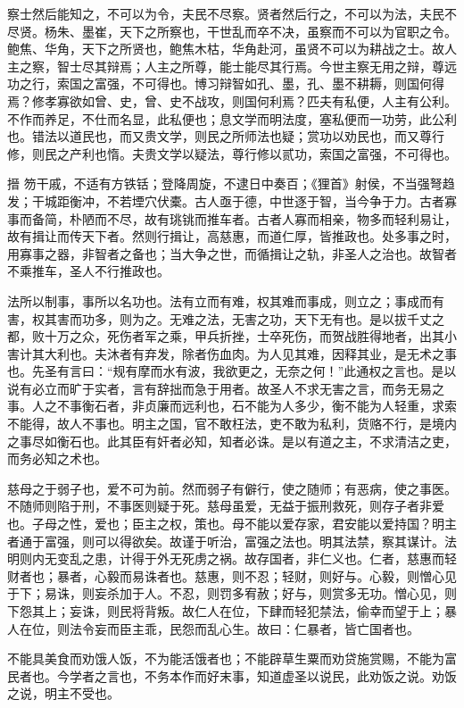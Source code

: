 \documentclass[]{article}
\begin{document}
察士然后能知之，不可以为令，夫民不尽察。贤者然后行之，不可以为法，夫民不尽贤。杨朱、墨崔，天下之所察也，干世乱而卒不决，虽察而不可以为官职之令。鲍焦、华角，天下之所贤也，鲍焦木枯，华角赴河，虽贤不可以为耕战之士。故人主之察，智士尽其辩焉；人主之所尊，能士能尽其行焉。今世主察无用之辩，尊远功之行，索国之富强，不可得也。博习辩智如孔、墨，孔、墨不耕耨，则国何得焉？修孝寡欲如曾、史，曾、史不战攻，则国何利焉？匹夫有私便，人主有公利。不作而养足，不仕而名显，此私便也；息文学而明法度，塞私便而一功劳，此公利也。错法以道民也，而又贵文学，则民之所师法也疑；赏功以劝民也，而又尊行修，则民之产利也惰。夫贵文学以疑法，尊行修以贰功，索国之富强，不可得也。

搢
笏干戚，不适有方铁铦；登降周旋，不逮日中奏百；《狸首》射侯，不当强弩趋发；干城距衡冲，不若堙穴伏橐。古人亟于德，中世逐于智，当今争于力。古者寡事而备简，朴陋而不尽，故有珧铫而推车者。古者人寡而相亲，物多而轻利易让，故有揖让而传天下者。然则行揖让，高慈惠，而道仁厚，皆推政也。处多事之时，用寡事之器，非智者之备也；当大争之世，而循揖让之轨，非圣人之治也。故智者不乘推车，圣人不行推政也。

法所以制事，事所以名功也。法有立而有难，权其难而事成，则立之；事成而有害，权其害而功多，则为之。无难之法，无害之功，天下无有也。是以拔千丈之都，败十万之众，死伤者军之乘，甲兵折挫，士卒死伤，而贺战胜得地者，出其小害计其大利也。夫沐者有弃发，除者伤血肉。为人见其难，因释其业，是无术之事也。先圣有言曰：``规有摩而水有波，我欲更之，无奈之何！''此通权之言也。是以说有必立而旷于实者，言有辞拙而急于用者。故圣人不求无害之言，而务无易之事。人之不事衡石者，非贞廉而远利也，石不能为人多少，衡不能为人轻重，求索不能得，故人不事也。明主之国，官不敢枉法，吏不敢为私利，货赂不行，是境内之事尽如衡石也。此其臣有奸者必知，知者必诛。是以有道之主，不求清洁之吏，而务必知之术也。

慈母之于弱子也，爱不可为前。然而弱子有僻行，使之随师；有恶病，使之事医。不随师则陷于刑，不事医则疑于死。慈母虽爱，无益于振刑救死，则存子者非爱也。子母之性，爱也；臣主之权，策也。母不能以爱存家，君安能以爱持国？明主者通于富强，则可以得欲矣。故谨于听治，富强之法也。明其法禁，察其谋计。法明则内无变乱之患，计得于外无死虏之祸。故存国者，非仁义也。仁者，慈惠而轻财者也；暴者，心毅而易诛者也。慈惠，则不忍；轻财，则好与。心毅，则憎心见于下；易诛，则妄杀加于人。不忍，则罚多宥赦；好与，则赏多无功。憎心见，则下怨其上；妄诛，则民将背叛。故仁人在位，下肆而轻犯禁法，偷幸而望于上；暴人在位，则法令妄而臣主乖，民怨而乱心生。故曰：仁暴者，皆亡国者也。

不能具美食而劝饿人饭，不为能活饿者也；不能辟草生粟而劝贷施赏赐，不能为富民者也。今学者之言也，不务本作而好末事，知道虚圣以说民，此劝饭之说。劝饭之说，明主不受也。
\end{document}
